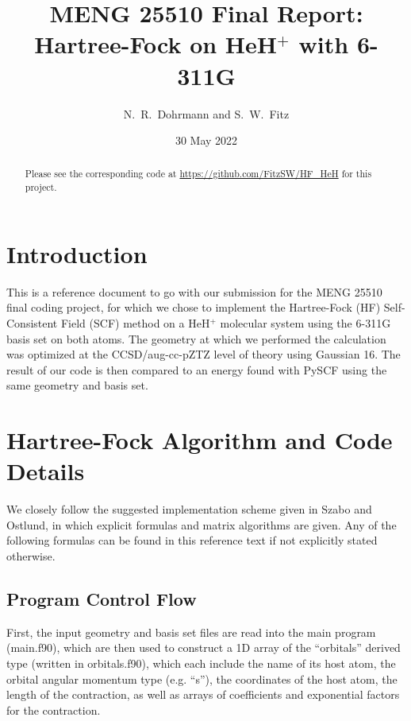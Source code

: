 \documentclass[%
 aip,
 amsmath,amssymb,
 reprint,%
]{revtex4-1}
\begin{document}

\title[MENG 25510 Final]{MENG 25510 Final Report:\\ Hartree-Fock on
HeH$^{+}$ with 6-311G}
\author{N.\ R.\ Dohrmann and S.\ W.\ Fitz}


\date{30 May 2022}%

\begin{abstract}
Please see the corresponding code at \url{https://github.com/FitzSW/HF_HeH}
for this project.
\end{abstract}

\maketitle

\section{Introduction}
This is a reference document to go with our submission for the MENG 25510
final coding project, for which we chose to implement the Hartree-Fock (HF)
Self-Consistent Field (SCF) method on a HeH$^{+}$ molecular system using the
6-311G basis set on both atoms. The geometry at which we performed the
calculation was optimized at the CCSD/aug-cc-pZTZ level of theory using
Gaussian 16\cite{g16}. The result of our code is then compared to an energy
found with
PySCF\cite{sun2020recent,https://doi.org/10.1002/wcms.1340,https://doi.org/10.1002/jcc.23981}
using the same geometry and basis set.

\section{Hartree-Fock Algorithm and Code Details}
We closely follow the suggested implementation scheme given in Szabo and
Ostlund\cite{szabo2012modern}, in which explicit formulas and matrix
algorithms are given. Any of the following formulas can be found in this
reference text if not explicitly stated otherwise.

\subsection{Program Control Flow} 
First, the input geometry and basis set files are read into the main program
({\code main.f90}), which are then used to construct a 1D array of the
``orbitals'' derived type (written in {\code orbitals.f90}), which each include
the name of its host atom, the orbital angular momentum type (e.g. ``s''), the
coordinates of the host atom, the length of the contraction, as well as arrays
of coefficients and exponential factors for the contraction.
\end{document}
